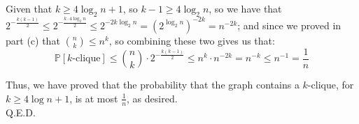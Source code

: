 \documentclass{article}
\begin{document}
Given that $k\geq 4\log_{2}n+1$, so $k-1\geq4\log_{2}n$, so we have that
$2^{-\frac{k(k-1)}{2}}\leq
2^{-\frac{k\cdot4\log_{2}n}{2}}\leq
2^{-2k\log_{2}n} = (2^{\log_{2}n})^{-2k} =
n^{-2k}$; and since we proved in part (c) that $\binom{n}{k}\leq n^k$, so combining these two gives us that:
$$\mathbb{P}[k\text{-clique}] \leq \binom{n}{k}\cdot 2^{-\frac{k(k-1)}{2}} \leq
n^k\cdot n^{-2k} = n^{-k} \leq n^{-1} = \frac{1}{n}$$

Thus, we have proved that the probability that the graph contains a $k$-clique, for $k\geq4\log n+1$, is at most $\frac{1}{n}$, as desired. \\

Q.E.D.
\end{document}
